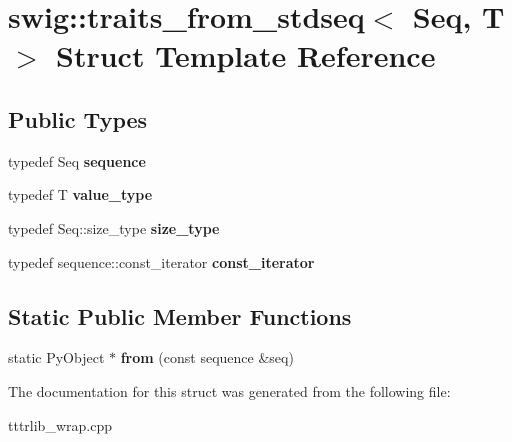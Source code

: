 \hypertarget{structswig_1_1traits__from__stdseq}{}\section{swig\+:\+:traits\+\_\+from\+\_\+stdseq$<$ Seq, T $>$ Struct Template Reference}
\label{structswig_1_1traits__from__stdseq}
\subsection*{Public Types}
\begin{DoxyCompactItemize}
\item 
\mbox{\label{structswig_1_1traits__from__stdseq_ad784f89c80055794b0da097a644ab7ab}} 
typedef Seq {\bfseries sequence}
\item 
\mbox{\label{structswig_1_1traits__from__stdseq_a2159701c1eaadbf75d9b3014fea48706}} 
typedef T {\bfseries value\+\_\+type}
\item 
\mbox{\label{structswig_1_1traits__from__stdseq_a1189d4a7cea9e522a7c10ed7ff2ce232}} 
typedef Seq\+::size\+\_\+type {\bfseries size\+\_\+type}
\item 
\mbox{\label{structswig_1_1traits__from__stdseq_ab1c085e18d48f5f0afe549b4dc885290}} 
typedef sequence\+::const\+\_\+iterator {\bfseries const\+\_\+iterator}
\end{DoxyCompactItemize}
\subsection*{Static Public Member Functions}
\begin{DoxyCompactItemize}
\item 
\mbox{\label{structswig_1_1traits__from__stdseq_ab65e9ff3dbb76a137536483c6121584b}} 
static Py\+Object $\ast$ {\bfseries from} (const sequence \&seq)
\end{DoxyCompactItemize}


The documentation for this struct was generated from the following file\+:\begin{DoxyCompactItemize}
\item 
tttrlib\+\_\+wrap.\+cpp\end{DoxyCompactItemize}
